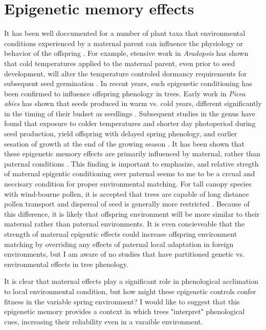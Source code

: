 \documentclass{article}\usepackage[]{graphicx}\usepackage[]{color}
\begin{document}
\section{Epigenetic memory effects}
\par It has been well doccumented for a number of plant taxa that environmental conditions experienced by a maternal parent can influence the physiology or behavior of the offspring \citep{}. For example, etensive work in \textit{Aradopsis} has shown that cold temperatures applied to the maternal parent, even prior to seed development, will alter the temperature controled dormancy requirements for subsequent seed germination \citep{Auge2017}. In recent years, such epigenetic conditioning has been confirmed to influence offspring phenology in trees. Early work in \textit{Picea abies} has shown that seeds produced in warm vs. cold years, different significantly in the timing of their budset as seedlings \citep{Kohmann1994}. Subsequent studies in the genus have found that exposure to colder temperatures and shorter day photoperiod during seed production, yield offspring with delayed spring phenology, and earlier sesation of growth at the end of the growing season \citep{Johnsen2005, Gomery2014}. It has been shown that these epigenetic memory effects are primarily influenced by maternal, rather than paternal conditions \citep{Johnsen1996}. This finding is important to emphasize, and relative stregth of maternal epigentic conditioning over paternal seems to me to be a crcual and neccisary condition for proper environmental matching. For tall canopy species with wind-bourne pollen, it is accepted that trees are capable of long distance pollen transport and dispersal of seed is generally more restricted \citep{}. Because of this difference, it is likely that offspring environment will be more similar to their maternal rather than paternal environments. It is even concieveable that the strength of maternal epigentic effects could increase offspring environment matching by overriding any effects of paternal local adaptation in foreign environments, but I am aware of no studies that have partitioned genetic vs. environmental effects in tree phenology.
\par It is clear that maternal effects play a significant role in phenological acclimation to local environmental condition, but how might these epigenetic controls confer fitness in the variable spring environment? I would like to suggest that this epigenetic memory provides a context in which trees "interpret" phenological cues, increasing their reliability even in a varaible environment.
\end{document}
